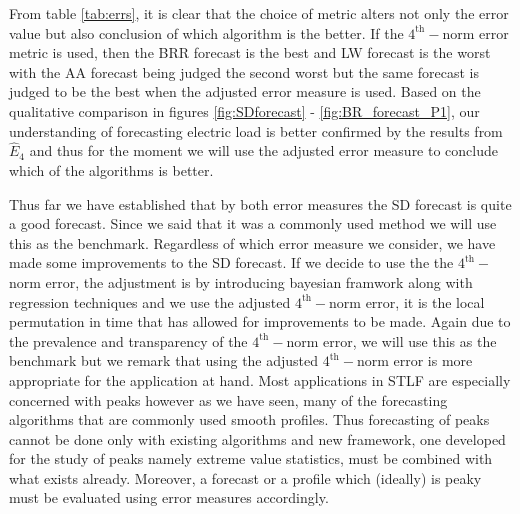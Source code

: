 From table \ref{tab:errs}, it is clear that the choice of metric alters not only the error value but also conclusion of which algorithm is the better. If the $4^{\text{th}}-$norm error metric is used, then the BRR forecast is the best and LW forecast is the worst with the AA forecast being judged the second worst but the same forecast is judged to be the best when the adjusted error measure is used. Based on the qualitative comparison in figures \ref{fig:SDforecast} - \ref{fig:BR_forecast_P1}, our understanding of forecasting electric load is better confirmed by the results from $\hat{E}_4$ and thus for the moment we will use the adjusted error measure to conclude which of the algorithms is better.

Thus far we have established that by both error measures the SD forecast is quite a good forecast. Since we said that it was a commonly used method we will use this as the benchmark. Regardless of which error measure we consider, we have made some improvements to the SD forecast. If we decide to use the the $4^{\text{th}}-$norm error, the adjustment is by introducing bayesian framwork along with regression techniques and we use the adjusted $4^{\text{th}}-$norm error, it is the local permutation in time that has allowed for improvements to be made. Again due to the prevalence and transparency of the $4^{\text{th}}-$norm error, we will use this as the benchmark but we remark that using the adjusted $4^{\text{th}}-$norm error is more appropriate for the application at hand. Most applications in STLF are especially concerned with peaks however as we have seen, many of the forecasting algorithms that are commonly used smooth profiles. Thus forecasting of peaks cannot be done only with existing algorithms and new framework, one developed for the study of peaks namely extreme value statistics, must be combined with what exists already. Moreover, a forecast or a profile which (ideally) is peaky must be evaluated using error measures accordingly.




